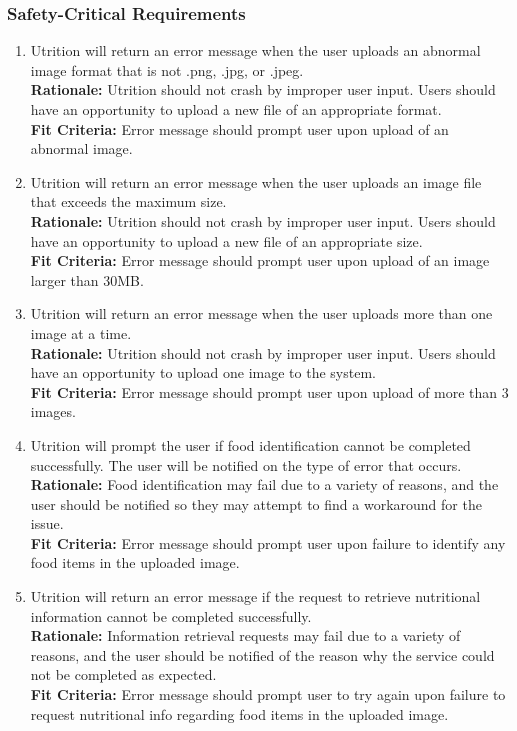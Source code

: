 \documentclass[12pt]{article}
\begin{document}
\subsubsection{Safety-Critical Requirements}
\begin{enumerate}[start=4,label={PR\arabic*.}]
	\item Utrition will return an error message when the user uploads an abnormal 
	image format that is not .png, .jpg, or .jpeg. \\
	\textbf{Rationale:}  Utrition should not crash by improper user 
	input. Users should have an opportunity to upload a new file of an appropriate 
	format.\\	
	\textbf{Fit Criteria:} Error message should prompt user upon upload of an abnormal 
	image.
	
	\item Utrition will return an error message when the user uploads an image file 
	that exceeds the maximum size. \\
	\textbf{Rationale:}  Utrition should not crash by improper user 
	input. Users should have an opportunity to upload a new file of an appropriate 
	size.\\	
	\textbf{Fit Criteria:} Error message should prompt user upon upload of an image 
	larger than 30MB.
	
	\item Utrition will return an error message when the user uploads more than one image at a time. \\
	\textbf{Rationale:}  Utrition should not crash by improper user 
	input. Users should have an opportunity to upload one image to the system.\\	
	\textbf{Fit Criteria:} Error message should prompt user upon upload of more than 3 
	images.
	
	\item Utrition will prompt the user if food identification cannot 
	be completed successfully. The user will be notified on the type of error 
	that occurs. \\
	\textbf{Rationale:}  Food identification may fail due to a variety of 
	reasons, and the user should be notified so they may attempt to find a  
	workaround for the issue. \\	
	\textbf{Fit Criteria:} Error message should prompt user upon failure to identify 
	any food items in the uploaded image.
	
	\item Utrition will return an error message if the request to retrieve 
	nutritional information cannot be completed successfully. \\
	\textbf{Rationale:}  Information retrieval requests may fail due to a 
	variety of reasons, and the user should be notified of the reason why the 
	service could not be completed as expected.\\	
	\textbf{Fit Criteria:} Error message should prompt user to try again upon failure 
	to request nutritional info regarding food items in the uploaded image.
	

\end{enumerate}
\end{document}
